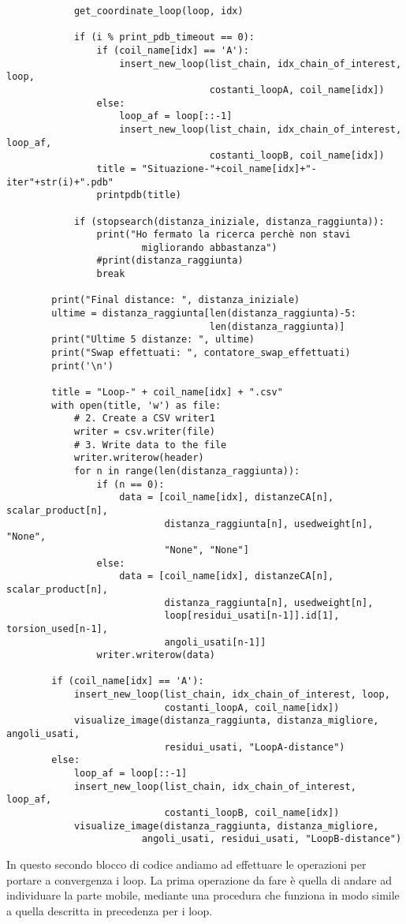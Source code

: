 \begin{verbatim}
            get_coordinate_loop(loop, idx)

            if (i % print_pdb_timeout == 0):
                if (coil_name[idx] == 'A'):
                    insert_new_loop(list_chain, idx_chain_of_interest, loop, 
                                    costanti_loopA, coil_name[idx])
                else: 
                    loop_af = loop[::-1] 
                    insert_new_loop(list_chain, idx_chain_of_interest, loop_af, 
                                    costanti_loopB, coil_name[idx])
                title = "Situazione-"+coil_name[idx]+"-iter"+str(i)+".pdb"
                printpdb(title)
            
            if (stopsearch(distanza_iniziale, distanza_raggiunta)):
                print("Ho fermato la ricerca perchè non stavi   
                        migliorando abbastanza")
                #print(distanza_raggiunta)
                break

        print("Final distance: ", distanza_iniziale)
        ultime = distanza_raggiunta[len(distanza_raggiunta)-5:
                                    len(distanza_raggiunta)]
        print("Ultime 5 distanze: ", ultime)
        print("Swap effettuati: ", contatore_swap_effettuati)
        print('\n')

        title = "Loop-" + coil_name[idx] + ".csv"
        with open(title, 'w') as file:
            # 2. Create a CSV writer1
            writer = csv.writer(file)
            # 3. Write data to the file
            writer.writerow(header)
            for n in range(len(distanza_raggiunta)):
                if (n == 0):
                    data = [coil_name[idx], distanzeCA[n], scalar_product[n], 
                            distanza_raggiunta[n], usedweight[n], "None", 
                            "None", "None"]
                else:
                    data = [coil_name[idx], distanzeCA[n], scalar_product[n], 
                            distanza_raggiunta[n], usedweight[n], 
                            loop[residui_usati[n-1]].id[1], torsion_used[n-1], 
                            angoli_usati[n-1]]
                writer.writerow(data)
        
        if (coil_name[idx] == 'A'):
            insert_new_loop(list_chain, idx_chain_of_interest, loop, 
                            costanti_loopA, coil_name[idx])
            visualize_image(distanza_raggiunta, distanza_migliore, angoli_usati, 
                            residui_usati, "LoopA-distance")
        else:
            loop_af = loop[::-1] 
            insert_new_loop(list_chain, idx_chain_of_interest, loop_af, 
                            costanti_loopB, coil_name[idx])
            visualize_image(distanza_raggiunta, distanza_migliore, 
                        angoli_usati, residui_usati, "LoopB-distance")
\end{verbatim}
In questo secondo blocco di codice andiamo ad effettuare le operazioni per portare a convergenza i loop. La prima operazione da fare è quella di andare ad individuare 
la parte mobile, mediante una procedura che funziona in modo simile a quella descritta in precedenza per i loop. 

